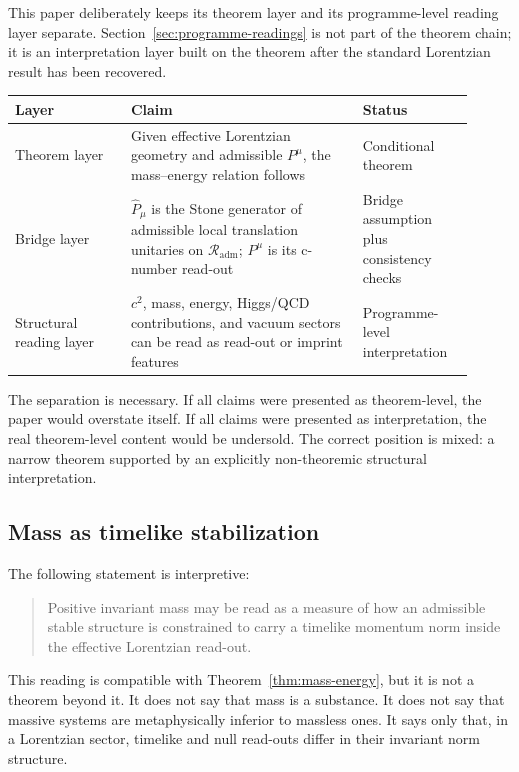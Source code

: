 \documentclass[12pt,a4paper]{article}
\theoremstyle{definition}
\theoremstyle{remark}
\newcommand{\Rout}{\mathcal{R}_{\mathrm{adm}}}
\begin{document}
This paper deliberately keeps its theorem layer and its programme-level reading layer separate. Section~\ref{sec:programme-readings} is not part of the theorem chain; it is an interpretation layer built on the theorem after the standard Lorentzian result has been recovered.

\begin{center}
\begin{tabular}{P{0.23\linewidth}P{0.46\linewidth}P{0.22\linewidth}}
\toprule
\textbf{Layer} & \textbf{Claim} & \textbf{Status} \\
\midrule
Theorem layer & Given effective Lorentzian geometry and admissible $P^\mu$, the mass--energy relation follows & Conditional theorem \\
Bridge layer & $\hat P_\mu$ is the Stone generator of admissible local translation unitaries on $\Rout$; $P^\mu$ is its c-number read-out & Bridge assumption plus consistency checks \\
Structural reading layer & $c^2$, mass, energy, Higgs/QCD contributions, and vacuum sectors can be read as read-out or imprint features & Programme-level interpretation \\
\bottomrule
\end{tabular}
\end{center}

The separation is necessary. If all claims were presented as theorem-level, the paper would overstate itself. If all claims were presented as interpretation, the real theorem-level content would be undersold. The correct position is mixed: a narrow theorem supported by an explicitly non-theoremic structural interpretation.

\subsection{Mass as timelike stabilization}

The following statement is interpretive:

\begin{quote}
Positive invariant mass may be read as a measure of how an admissible stable structure is constrained to carry a timelike momentum norm inside the effective Lorentzian read-out.
\end{quote}

This reading is compatible with Theorem~\ref{thm:mass-energy}, but it is not a theorem beyond it. It does not say that mass is a substance. It does not say that massive systems are metaphysically inferior to massless ones. It says only that, in a Lorentzian sector, timelike and null read-outs differ in their invariant norm structure.
\end{document}
